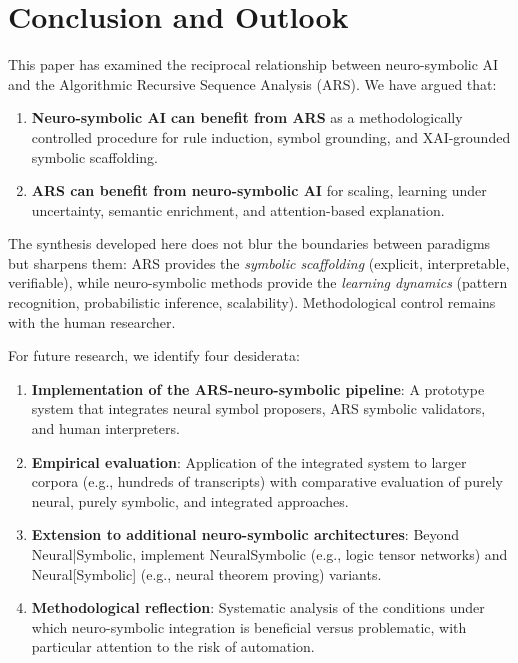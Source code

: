 \documentclass[12pt,a4paper]{article}
\begin{document}
\section{Conclusion and Outlook}

This paper has examined the reciprocal relationship between neuro-symbolic AI 
and the Algorithmic Recursive Sequence Analysis (ARS). We have argued that:

\begin{enumerate}
    \item \textbf{Neuro-symbolic AI can benefit from ARS} as a methodologically 
    controlled procedure for rule induction, symbol grounding, and XAI-grounded 
    symbolic scaffolding.
    
    \item \textbf{ARS can benefit from neuro-symbolic AI} for scaling, learning 
    under uncertainty, semantic enrichment, and attention-based explanation.
\end{enumerate}

The synthesis developed here does not blur the boundaries between paradigms 
but sharpens them: ARS provides the \textit{symbolic scaffolding} (explicit, 
interpretable, verifiable), while neuro-symbolic methods provide the 
\textit{learning dynamics} (pattern recognition, probabilistic inference, 
scalability). Methodological control remains with the human researcher.

For future research, we identify four desiderata:

\begin{enumerate}
    \item \textbf{Implementation of the ARS-neuro-symbolic pipeline}: A prototype 
    system that integrates neural symbol proposers, ARS symbolic validators, and 
    human interpreters.
    
    \item \textbf{Empirical evaluation}: Application of the integrated system 
    to larger corpora (e.g., hundreds of transcripts) with comparative evaluation 
    of purely neural, purely symbolic, and integrated approaches.
    
    \item \textbf{Extension to additional neuro-symbolic architectures}: Beyond 
    Neural|Symbolic, implement NeuralSymbolic (e.g., logic tensor networks) and 
    Neural[Symbolic] (e.g., neural theorem proving) variants.
    
    \item \textbf{Methodological reflection}: Systematic analysis of the conditions 
    under which neuro-symbolic integration is beneficial versus problematic, 
    with particular attention to the risk of automation.
\end{enumerate}
\end{document}
